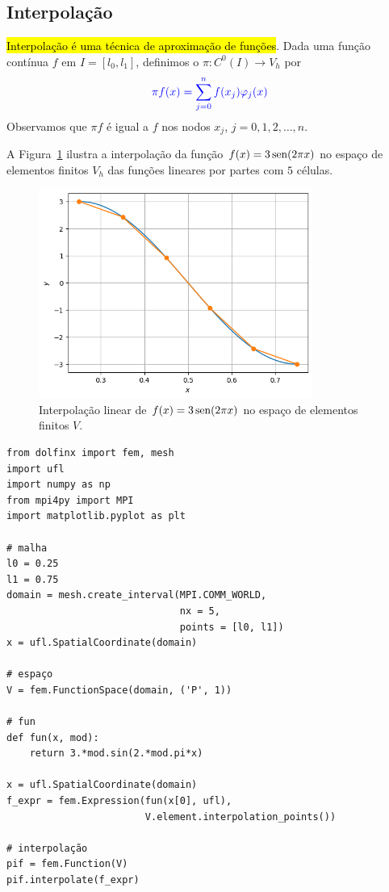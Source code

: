 \subsection{Interpolação}

\hl{Interpolação é uma técnica de aproximação de funções}. Dada uma função contínua $f$ em $I=[l_0, l_1]$, definimos o  $\pi: C^0(I)\to V_h$ por
\begin{equation}\color{blue}\pi f (x) = \sum_{j=0}^{n}f(x_j)\varphi_j(x)
\end{equation}
Observamos que $\pi f$ é igual a $f$ nos nodos $x_j$, $j=0, 1, 2, \dotsc, n$. 

\begin{ex}\label{ex:mef1d_interp_lin}
  A Figura~\ref{fig:ex_mef1d_interp_lin} ilustra a interpolação da função $f(x)=3\operatorname{sen}(2\pi x)$ no espaço de elementos finitos $V_h$ das funções lineares por partes com $5$ células.

  \begin{figure}[H]
    \centering
    \includegraphics[width=0.8\textwidth]{./cap_mef1d/dados/ex_mef1d_interp_lin/fig}
    \caption{Interpolação linear de $f(x)=3\operatorname{sen}(2\pi x)$ no espaço de elementos finitos $V$.}
    \label{fig:ex_mef1d_interp_lin}
  \end{figure}


\begin{lstlisting}[caption=mef1d\_interp\_lin]
from dolfinx import fem, mesh
import ufl
import numpy as np
from mpi4py import MPI
import matplotlib.pyplot as plt

# malha
l0 = 0.25
l1 = 0.75
domain = mesh.create_interval(MPI.COMM_WORLD,
                              nx = 5,
                              points = [l0, l1])
x = ufl.SpatialCoordinate(domain)

# espaço
V = fem.FunctionSpace(domain, ('P', 1))

# fun
def fun(x, mod):
    return 3.*mod.sin(2.*mod.pi*x)

x = ufl.SpatialCoordinate(domain)
f_expr = fem.Expression(fun(x[0], ufl),
                        V.element.interpolation_points())

# interpolação
pif = fem.Function(V)
pif.interpolate(f_expr)
\end{lstlisting}
\end{ex}

